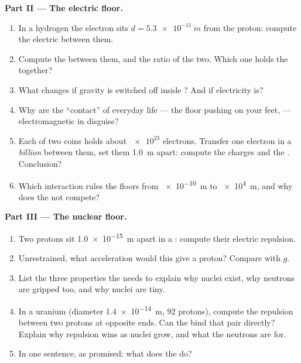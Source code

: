 \begin{problem}
\medskip
\noindent\textbf{Part II --- The electric floor.}
\begin{enumerate}[resume]
  \item In a hydrogen  the electron sits $d = \qty{5.3e-11}{m}$
        from the proton: compute the electric  between them.
  \item Compute the  between them, and the ratio of
        the two. Which one holds the  together?
  \item What changes if gravity is switched off inside ? And if
        electricity is?
  \item Why are the ``contact''  of everyday life --- the floor
        pushing on your feet,  --- electromagnetic in disguise?
  \item Each of two coins holds about $\num{e23}$ electrons. Transfer
        one electron in a \emph{billion} between them, set them
        \qty{1.0}{m} apart: compute the charges and the . Conclusion?
  \item Which interaction rules the floors from \qty{e-10}{m} to
        \qty{e4}{m}, and why does the  not compete?
\end{enumerate}

\medskip
\noindent\textbf{Part III --- The nuclear floor.}
\begin{enumerate}[resume]
  \item Two protons sit \qty{1.0e-15}{m} apart in a : compute
        their electric repulsion.
  \item Unrestrained, what acceleration would this  give a proton?
        Compare with $g$.
  \item List the three properties the  needs to
        explain why nuclei exist, why neutrons are gripped too, and why
        nuclei are tiny.
  \item In a uranium  (diameter \qty{1.4e-14}{m}, $92$ protons),
        compute the repulsion between two protons at opposite ends. Can
        the  bind that pair directly? Explain why
        repulsion wins as nuclei grow, and what the neutrons are for.
  \item In one sentence, as promised: what does the  do?
\end{enumerate}


\end{problem}
